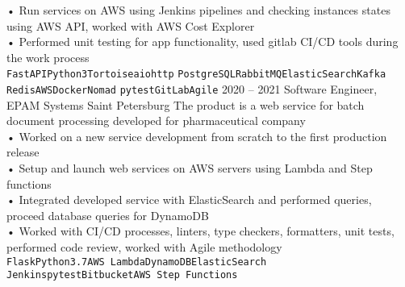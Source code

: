 {\begin{entrylist}
{            • Run services on AWS using Jenkins pipelines and checking instances states using AWS API, worked with AWS Cost Explorer \\
            • Performed unit testing for app functionality, used gitlab CI/CD tools during the work process \\
			\texttt{FastAPI}\slashsep\texttt{Python3}\slashsep\texttt{Tortoise}\slashsep\texttt{aiohttp}\slashsep
			\texttt{PostgreSQL}\slashsep\texttt{RabbitMQ}\slashsep\texttt{ElasticSearch}\slashsep\texttt{Kafka}
			\slashsep\texttt{Redis}\slashsep\texttt{AWS}\slashsep\texttt{Docker}\slashsep\texttt{Nomad}\slashsep
			\texttt{pytest}\slashsep\texttt{GitLab}\slashsep\texttt{Agile}
		}
		\entry
		{2020 – 2021}
		{Software Engineer, EPAM Systems}
		{Saint Petersburg}
		{
		    The product is a web service for batch document processing developed for pharmaceutical company \\
			• Worked on a new service development from scratch to the first production release \\
            • Setup and launch web services on AWS servers using Lambda and Step functions \\
            • Integrated developed service with ElasticSearch and performed queries, proceed database queries for DynamoDB \\
            • Worked with CI/CD processes, linters, type checkers, formatters, unit tests, performed code review, worked with Agile methodology \\
			\texttt{Flask}\slashsep\texttt{Python3.7}\slashsep\texttt{AWS Lambda}\slashsep\texttt{DynamoDB}\slashsep\texttt{ElasticSearch}\\
			\texttt{Jenkins}\slashsep\texttt{pytest}\slashsep\texttt{Bitbucket}\slashsep\texttt{AWS Step Functions}
		}
	\end{entrylist}
}

\newcommand{\cvtemplateeducation}{Education}
\newcommand{\cveducation}{
	\begin{entrylist}
	    \entry
		{2018}
		{Python course, EPAM Systems}
		{Saint Petersburg}
		{
			During the course, all main Python topics have been learnt and put into practice.
			Developed a web service for getting some statistics from external API and displaying it in graphs view.\\
			\texttt{Python3}\slashsep\texttt{Flask}
		}
		\entry
		{2014 – 2020}
		{Bachelor/Master's Degrees in Software Engineering, ITMO University}
		{Saint Petersburg}
		{
			Studied Software Engineering in ITMO University.
			The final project was a web service for saving educational results [certificates] based on Blockchain technology.\\
			\texttt{Python3}\slashsep\texttt{Django}\slashsep\texttt{SQLite}
		}
	\end{entrylist}
}

